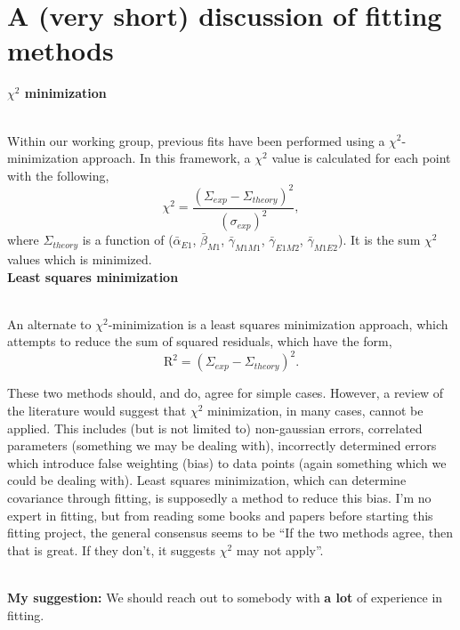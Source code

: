 \documentclass[]{article}
\begin{document}
\newpage
\section{A (very short) discussion of fitting methods} 

\noindent \textbf{$\chi^{2}$ minimization}

\noindent \\Within our working group, previous fits have been performed using a $\chi^{2}$-minimization approach. In this framework, a $\chi^{2}$ value is calculated for each point with the following,
%
\begin{equation}
\chi^{2} = \frac{(\Sigma_{exp} - \Sigma_{theory})^{2}}{(\sigma_{exp})^{2}} ,\nonumber
\end{equation}
%
where $\Sigma_{theory}$ is a function of ($\bar{\alpha}_{E1}$, $\bar{\beta}_{M1}$, $\bar{\gamma}_{M1M1}$, $\bar{\gamma}_{E1M2}$, $\bar{\gamma}_{M1E2}$). It is the sum $\chi^{2}$ values which is minimized. \\

\noindent \textbf{Least squares minimization}

\noindent \\An alternate to $\chi^{2}$-minimization is a least squares minimization approach, which attempts to reduce the sum of squared residuals, which have the form, 
%
\begin{equation}
\text{R}^{2} = (\Sigma_{exp} - \Sigma_{theory})^{2} .\nonumber
\end{equation}

\noindent These two methods should, and do, agree for simple cases. However, a review of the literature would suggest that $\chi^{2}$ minimization, in many cases, cannot be  applied. This includes (but is not limited to) non-gaussian errors, correlated parameters (something we may be dealing with), incorrectly determined errors which introduce false weighting (bias) to data points (again something which we could be dealing with). Least squares minimization, which can determine covariance through fitting, is supposedly a method to reduce this bias. I'm no expert in fitting, but from reading some books and papers before starting this fitting project, the general consensus seems to be \enquote{If the two methods agree, then that is great. If they don't, it suggests $\chi^{2}$ may not apply}.

\noindent \\ \textbf{My suggestion:} We should reach out to somebody with \textbf{a lot} of experience in fitting. \\
\end{document}
